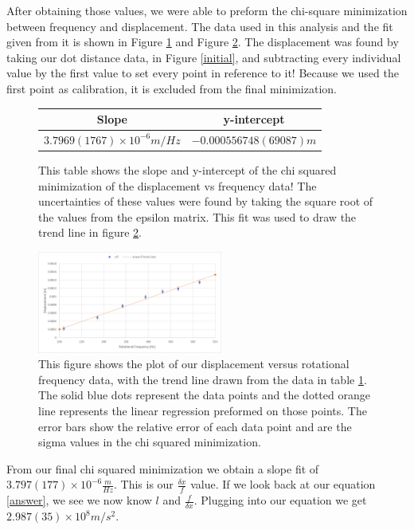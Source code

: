 \documentclass[aps,prl,10pt,twocolumn,floatfix]{revtex4-2}
\begin{document}
After obtaining those values, we were able to preform the chi-square minimization between frequency and displacement.
The data used in this analysis and the fit given from it is shown in Figure \ref{finalchi} and Figure \ref{finalgraph}.
The displacement was found by taking our dot distance data, in Figure \ref{initial}, and subtracting every individual value by the first value to set every point in reference to it! 
Because we used the first point as calibration, it is excluded from the final minimization.

\begin{figure}
\begin{tabular}{|c|c|}
\hline
Slope & y-intercept \\
\hline
$3.7969(1767)\times 10^{-6}m/Hz$ & $-0.000556748(69087)m$\\
\hline
\end{tabular}
\caption{This table shows the slope and y-intercept of the chi squared minimization of the displacement vs frequency data! The uncertainties of these values were found by taking the square root of the values from the epsilon matrix. This fit was used to draw the trend line in figure \ref{finalgraph}.}
\label{finalchi}
\end{figure}

\begin{figure}
\includegraphics[width=230px]{finalgraph.png}
\caption{This figure shows the plot of our displacement versus rotational frequency data, with the trend line drawn from the data in table \ref{finalchi}. The solid blue dots represent the data points and the dotted orange line represents the linear regression preformed on those points. The error bars show the relative error of each data point and are the sigma values in the chi squared minimization.}
\label{finalgraph}
\end{figure}

From our final chi squared minimization we obtain a slope fit of $3.797(177)\times 10^{-6}\frac{m}{Hz}$. 
This is our $\frac{\delta x}{f}$ value.
If we look back at our equation \ref{answer}, we see we now know $l$ and $\frac{f}{\delta x}$.
Plugging into our equation we get $2.987(35)\times 10^{8}m/s^2$.
\end{document}
